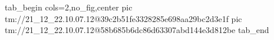  
 
 
 
 

\qqSecOrig


\ifcmt
  tab_begin cols=2,no_fig,center
    pic tm://21_12_22.10.07.12@39c2b51fe3328285e698aa29bc2d3e1f
    pic tm://21_12_22.10.07.12@58b685b6dc86d63307abd144e3d812be
  tab_end
\fi


